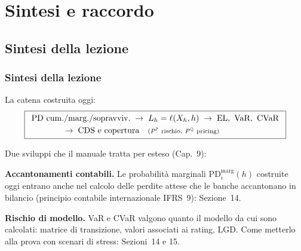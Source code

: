 

\section{Sintesi e raccordo}

\subsection{Sintesi della lezione}%

\begin{frame}%
%

\frametitle{Sintesi della lezione}%
%

%


La catena costruita oggi:
\[
\boxed{
\begin{array}{l}
\text{$\mathrm{PD}$ cum./marg./sopravviv.}
\;\rightarrow\;
L_h=\ell(X_h,h)
\;\rightarrow\;
\mathrm{EL},\ \operatorname{VaR},\ \operatorname{CVaR}
\\[1mm]
\qquad\qquad
\rightarrow\;
\text{CDS e copertura}
\quad
{\scriptstyle (P^{\mathbb{P}}\ \text{rischio},\ P^{\mathbb{Q}}\ \text{pricing})}
\end{array}
}
\]


\medskip

Due sviluppi che il manuale tratta per esteso (Cap.~9):

\begin{stepitemize}
\item \textbf{Accantonamenti contabili.} Le probabilit\`{a} marginali
$\mathrm{PD}_{i}^{\mathrm{marg}}(h)$ costruite oggi entrano anche nel calcolo
delle perdite attese che le banche accantonano in bilancio (principio
contabile internazionale IFRS~9): Sezione~14.

\item \textbf{Rischio di modello.} VaR e CVaR valgono quanto il modello da cui
sono calcolati: matrice di transizione, valori associati ai rating, LGD. Come
metterlo alla prova con scenari di stress: Sezioni~14 e 15.
\end{stepitemize}

%

\transboxout
\end{frame}%


